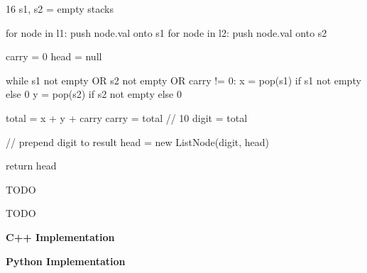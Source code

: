 \Algorithm
\begin{CodeBlock}[style=pseudo,caption={Pseudocode}]{16}
  s1, s2 = empty stacks

  for node in l1:
    push node.val onto s1
  for node in l2:
    push node.val onto s2

  carry = 0
  head = null

  while s1 not empty OR s2 not empty OR carry != 0:
    x = pop(s1) if s1 not empty else 0
    y = pop(s2) if s2 not empty else 0

    total = x + y + carry
    carry = total // 10
    digit = total %

    // prepend digit to result
    head = new ListNode(digit, head)

  return head

\end{CodeBlock}


\Correctness
TODO

\Complexity
TODO

\bigskip
\noindent\textbf{C++ Implementation}



\bigskip
\noindent\textbf{Python Implementation}



\ProblemDivider
